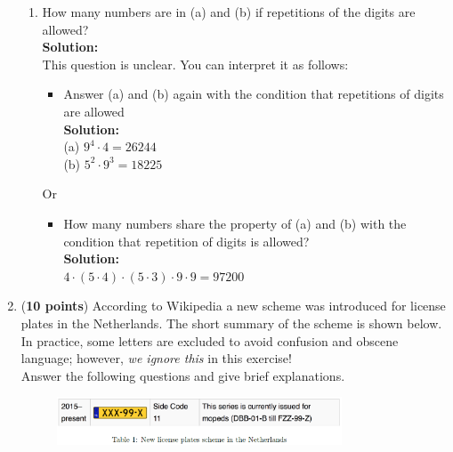 \documentclass[a4paper]{article}
\begin{document}
\begin{enumerate}
\begin{enumerate}
	
	
	\item How many numbers are in (a) and (b) if repetitions of the digits are allowed?\\
	\textbf{Solution:}\\


This question is unclear. You can interpret it as follows:

\begin{itemize}
	\item Answer (a) and (b) again with the condition that repetitions of digits are allowed\\
	\textbf{Solution:}\\
	
	(a) $9^4 \cdot 4 = 26244$\\
	(b)	$5^2 \cdot 9^3 = 18225$\\
	
\end{itemize}	

Or 
	
\begin{itemize}
	\item How many numbers share the property of (a) and (b) with the condition that repetition of digits is allowed?\\
	\textbf{Solution:}\\
	
	$4 \cdot (5 \cdot 4) \cdot (5 \cdot 3) \cdot 9 \cdot 9 = 97200$\\
\end{itemize}		
	
	
\end{enumerate}



\item (\textbf{10 points}) According to Wikipedia a new scheme was introduced for license plates in the Netherlands. The short summary of the scheme is shown below. In practice, some letters are excluded to avoid confusion and obscene language; however, \textit{we ignore this} in this exercise!\\
Answer the following questions and give brief explanations.

\begin{figure}[ht!]
	\centering
  \includegraphics[width=0.8\textwidth]{license.PNG}
\end{figure}	




\end{enumerate}
\end{document}
